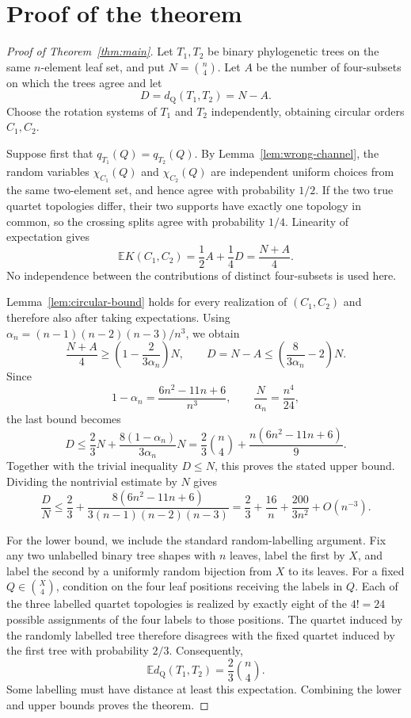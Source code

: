 \documentclass[a4paper]{amsart}
\theoremstyle{remark}
\newcommand{\qd}{d_{\mathrm Q}}
\newcommand{\E}{\mathbb E}
\begin{document}
\section{Proof of the theorem}

\begin{proof}[Proof of Theorem~\ref{thm:main}]
Let $T_1,T_2$ be binary phylogenetic trees on the same $n$-element
leaf set, and put $N=\binom n4$. Let $A$ be the number of
four-subsets on which the trees agree and let
\[
 D=\qd(T_1,T_2)=N-A.
\]
Choose the rotation systems of $T_1$ and $T_2$ independently,
obtaining circular orders $C_1,C_2$.

Suppose first that $q_{T_1}(Q)=q_{T_2}(Q)$. By
Lemma~\ref{lem:wrong-channel}, the random variables
$\chi_{C_1}(Q)$ and $\chi_{C_2}(Q)$ are independent uniform choices
from the same two-element set, and hence agree with probability
$1/2$. If the two true quartet topologies differ, their two supports
have exactly one topology in common, so the crossing splits agree
with probability $1/4$. Linearity of expectation gives
\[
 \E K(C_1,C_2)
 =\frac12A+\frac14D
 =\frac{N+A}{4}.
\]
No independence between the contributions of distinct four-subsets
is used here.

Lemma~\ref{lem:circular-bound} holds for every realization of
$(C_1,C_2)$ and therefore also after taking expectations. Using
$\alpha_n=(n-1)(n-2)(n-3)/n^3$, we obtain
\[
 \frac{N+A}{4}
 \ge
 \left(1-\frac{2}{3\alpha_n}\right)N,
 \qquad
 D=N-A
 \le
 \left(\frac{8}{3\alpha_n}-2\right)N.
\]
Since
\[
 1-\alpha_n=\frac{6n^2-11n+6}{n^3},
 \qquad
 \frac{N}{\alpha_n}=\frac{n^4}{24},
\]
the last bound becomes
\[
 D
 \le
 \frac23N+\frac{8(1-\alpha_n)}{3\alpha_n}N
 =
 \frac23\binom n4+\frac{n(6n^2-11n+6)}9.
\]
Together with the trivial inequality $D\le N$, this proves the stated
upper bound. Dividing the nontrivial estimate by $N$ gives
\[
 \frac{D}{N}
 \le
 \frac23+
 \frac{8(6n^2-11n+6)}{3(n-1)(n-2)(n-3)}
 =
 \frac23+\frac{16}{n}+\frac{200}{3n^2}+O(n^{-3}).
\]

For the lower bound, we include the standard random-labelling
argument. Fix any two unlabelled binary tree shapes with $n$ leaves,
label the first by $X$, and label the second by a uniformly random
bijection from $X$ to its leaves. For a fixed
$Q\in\binom X4$, condition on the four leaf positions receiving the
labels in $Q$. Each of the three labelled quartet topologies is
realized by exactly eight of the $4!=24$ possible assignments of the
four labels to those positions. The quartet induced by the randomly
labelled tree therefore disagrees with the fixed quartet induced by
the first tree with probability $2/3$. Consequently,
\[
 \E\qd(T_1,T_2)=\frac23\binom n4.
\]
Some labelling must have distance at least this expectation. Combining
the lower and upper bounds proves the theorem.
\end{proof}
\end{document}
